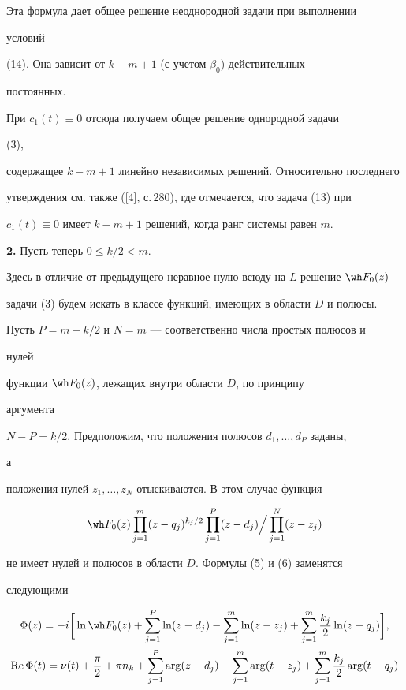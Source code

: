 Эта формула дает общее решение неоднородной задачи при выполнении 


условий 


(14). Она зависит от $k-m+1$ (с учетом $\beta_0$) действительных 


постоянных. 


При $c_1(t)\equiv0$ отсюда получаем общее решение однородной задачи 


(3), 


содержащее $k-m+1$ линейно независимых решений. Относительно последнего 


утверждения см. также ([4], с.\,280), где отмечается, что задача (13) при 


$c_1(t)\equiv0$ имеет $k-m+1$ решений, когда ранг системы равен $m$. 


\medskip 


 


{\bf 2.} Пусть теперь $0\le k/2<m$. 


Здесь в отличие от предыдущего неравное нулю всюду на $L$ решение $\wh 


F_0(z)$ 


задачи (3) будем искать в классе функций, имеющих в области $D$ и полюсы. 


Пусть $P=m-k/2$ и $N=m$ --- соответственно числа простых полюсов и 


нулей 


функции $\wh F_0(z)$, лежащих внутри области $D$, по принципу 


аргумента 


$N-P=k/2$. Предположим, что положения полюсов $d_1,\dotsc,d_P$ заданы, 


а 


положения нулей $z_1,\dotsc,z_N$ отыскиваются. В этом случае функция 


$$ 


\wh F_0(z)\prod^m_{j=1}(z-q_j)^{k_j/2}\prod^P_{j=1} 


(z-d_j)\Big/\prod^N_{j=1}(z-z_j) 


$$ 


не имеет нулей и полюсов в области $D$. Формулы (5) и (6) заменятся 


следующими 


\begin{gather} 


\Phi(z)=-i\bigg[\ln\wh F_0(z)+\sum^P_{j=1}\ln(z-d_j)- 


\sum^m_{j=1}\ln(z-z_j)+\sum^m_{j=1}\frac{k_j}{2} 


\ln(z-q_j)\bigg],\\ 


% 


\re\Phi(t)=\nu(t)+\frac{\pi}{2}+\pi n_k


+\sum^P_{j=1}\arg(z-d_j)-\sum^m_{j=1} 


\arg(t-z_j)+\sum^m_{j=1}\frac{k_j}{2}\arg(t-q_j) 


\end{gather} 


